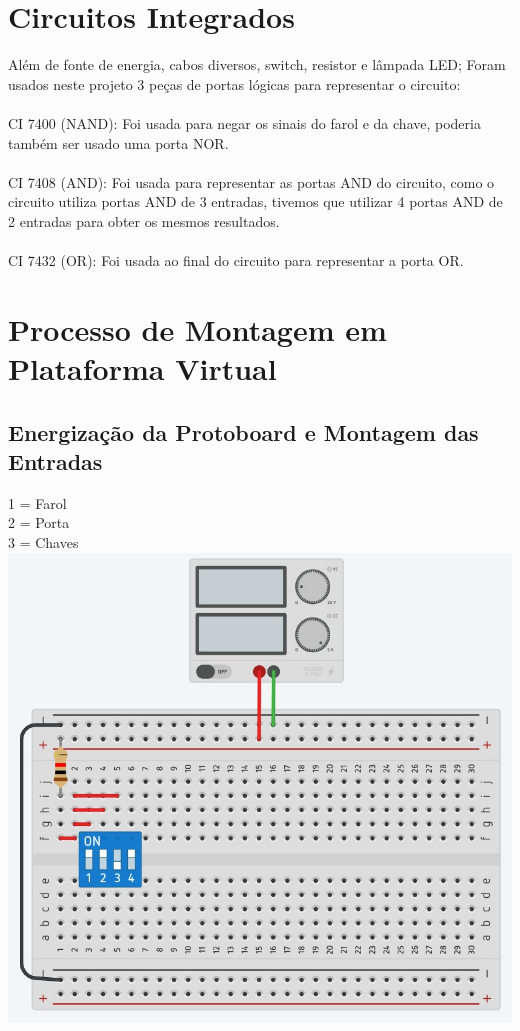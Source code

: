 \documentclass[]{article}
\begin{document}
	\section{Circuitos Integrados}
		Além de fonte de energia, cabos diversos, switch, resistor e lâmpada LED; Foram usados neste projeto 3 peças de portas lógicas para representar o circuito:\\ \\
		CI 7400 (NAND): Foi usada para negar os sinais do farol e da chave, poderia também ser usado uma porta NOR. \\ \\
		CI 7408 (AND): Foi usada para representar as portas AND do circuito, como o circuito utiliza portas AND de 3 entradas, tivemos que utilizar 4 portas AND de 2 entradas para obter os mesmos resultados. \\ \\
		CI 7432 (OR): Foi usada ao final do circuito para representar a porta OR. \\
	\section{Processo de Montagem em Plataforma Virtual}
		\subsection{Energização da Protoboard e Montagem das Entradas}
			1 = Farol \\ 2 = Porta \\ 3 = Chaves \\
			\includegraphics[scale=0.5]{Images/Tinkercad 01.jpg} \\
\end{document}
